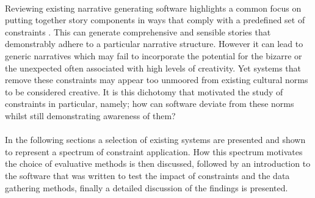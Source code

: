 \documentclass[letterpaper]{article}
\begin{document}
\\Reviewing existing narrative generating software highlights a common focus on putting together story components in ways that comply with a predefined set of constraints \cite{Perez2015,laclaustra2014}. This can generate comprehensive and sensible stories that demonstrably adhere to a particular narrative structure. However it can lead to generic narratives which may fail to incorporate the potential for the bizarre or the unexpected often associated with high levels of creativity. Yet systems that remove these constraints may appear too unmoored from existing cultural norms to be considered creative. It is this dichotomy that motivated the study of constraints in particular, namely; how can software deviate from these norms whilst still demonstrating awareness of them?\\
\\In the following sections a selection of existing systems are presented and shown to represent a spectrum of constraint application. How this spectrum motivates the choice of evaluative methods is then discussed, followed by an introduction to the software that was written to test the impact of constraints and the data gathering methods, finally a detailed discussion of the findings is presented.

\end{document}
